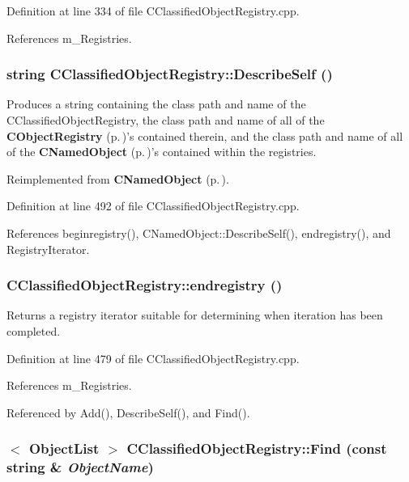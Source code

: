 Definition at line 334 of file CClassified\-Object\-Registry.cpp.

References m\_\-Registries.
\subsubsection{\setlength{\rightskip}{0pt plus 5cm}string CClassified\-Object\-Registry::Describe\-Self ()\hspace{0.3cm}{\tt  [virtual]}}\label{classCClassifiedObjectRegistry_a11}


Produces a string containing the class path and name of the CClassified\-Object\-Registry, the class path and name of all of the {\bf CObject\-Registry} {\rm (p.\,\pageref{classCObjectRegistry})}'s contained therein, and the class path and name of all of the {\bf CNamed\-Object} {\rm (p.\,\pageref{classCNamedObject})}'s contained within the registries. 

Reimplemented from {\bf CNamed\-Object} {\rm (p.\,\pageref{classCNamedObject_a8})}.

Definition at line 492 of file CClassified\-Object\-Registry.cpp.

References beginregistry(), CNamed\-Object::Describe\-Self(), endregistry(), and Registry\-Iterator.
\subsubsection{ CClassified\-Object\-Registry::endregistry ()}\label{classCClassifiedObjectRegistry_a10}


Returns a registry iterator suitable for determining when iteration has been completed. 

Definition at line 479 of file CClassified\-Object\-Registry.cpp.

References m\_\-Registries.

Referenced by Add(), Describe\-Self(), and Find().
\subsubsection{$<$ {\bf Object\-List} $>$ CClassified\-Object\-Registry::Find (const string \& {\em Object\-Name})}\label{classCClassifiedObjectRegistry_a8}


